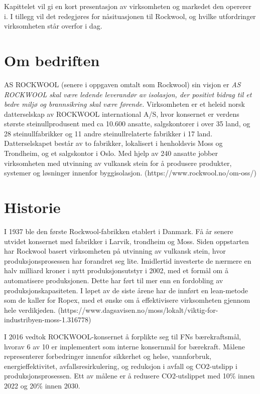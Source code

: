 Kapittelet vil gi en kort presentasjon av virksomheten og markedet den opererer i. I tillegg vil det redegjøres for nåsituasjonen til Rockwool, og hvilke utfordringer virksomheten står overfor i dag.

\section{Om bedriften}
AS ROCKWOOL (senere i oppgaven omtalt som Rockwool) sin visjon er \textit{AS ROCKWOOL skal være ledende leverandør av isolasjon, der positivt bidrag til et bedre miljø og brannsikring skal være førende.} Virksomheten er et heleid norsk datterselskap av ROCKWOOL international A/S, hvor konsernet er verdens største steinullprodusent med ca 10.600 ansatte, salgskontorer i over 35 land, og 28 steinullfabrikker og 11 andre steinullrelaterte fabrikker i 17 land. Datterselskapet består av to fabrikker, lokalisert i henholdsvis Moss og Trondheim, og et salgskontor i Oslo. Med hjelp av 240 ansatte jobber virksomheten med utvinning av vulkansk stein for å produsere produkter, systemer og løsninger innenfor byggisolasjon. (https://www.rockwool.no/om-oss/)

\section{Historie}
I 1937 ble den første Rockwool-fabrikken etablert i Danmark. Få år senere utvidet konsernet med fabrikker i Larvik, trondheim og Moss. Siden oppstarten har Rockwool basert virksomheten på utvinning av vulkansk stein, hvor produksjonsprosessen har forandret seg lite. Imidlertid investerte de nærmere en halv milliard kroner i nytt produksjonsutstyr i 2002, med et formål om å automatisere produksjonen. Dette har ført til mer enn en fordobling av produksjonskapasiteten. I løpet av de siste årene har de innført en lean-metode som de kaller for Ropex, med et ønske om å effektivisere virksomheten gjennom hele verdikjeden.
(https://www.dagsavisen.no/moss/lokalt/viktig-for-industribyen-moss-1.316778)

\indent \newline
I 2016 vedtok ROCKWOOL-konsernet å forplikte seg til FNs bærekraftsmål, hvorav 6 av 10 er implementert som interne konsernmål for bærekraft. Målene representerer forbedringer innenfor sikkerhet og helse, vannforbruk, energieffektivitet, avfallsresirkulering, og reduksjon i avfall og CO2-utslipp i produksjonsprosessen. Ett av målene er å redusere CO2-utslippet med 10\% innen 2022 og 20\% innen 2030.


